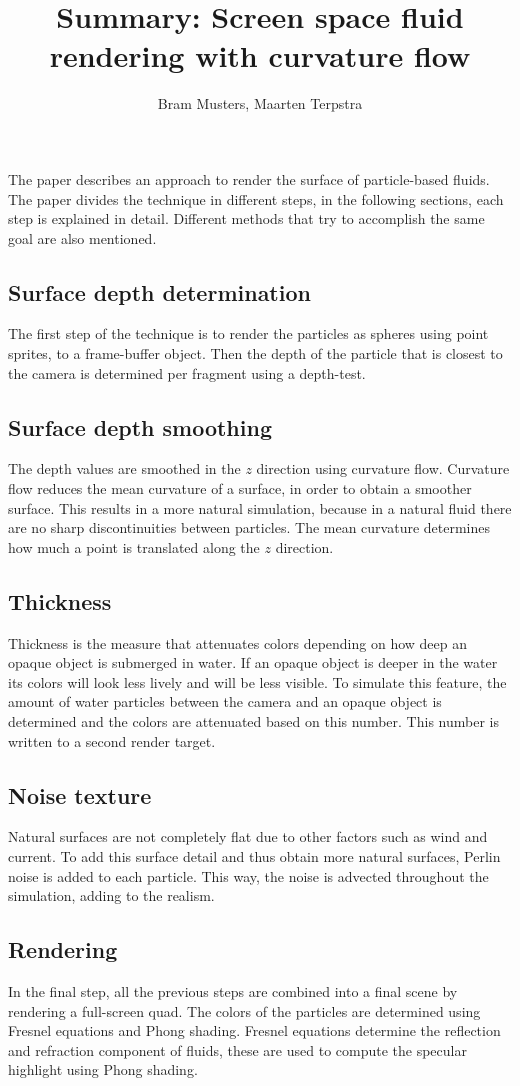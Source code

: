 \documentclass{article}
\title{Summary: Screen space fluid rendering with curvature flow}
\author{Bram Musters, Maarten Terpstra}
\begin{document}
\maketitle
The paper describes an approach to render the surface of particle-based fluids.
The paper divides the technique in different steps, in the following sections, each step is explained in detail.
Different methods that try to accomplish the same goal are also mentioned.


\subsection*{Surface depth determination}
The first step of the technique is to render the particles as spheres using point sprites, to a frame-buffer object.
Then the depth of the particle that is closest to the camera is determined per fragment using a depth-test.

\subsection*{Surface depth smoothing}
The depth values are smoothed in the $z$ direction using curvature flow.
Curvature flow reduces the mean curvature of a surface, in order to obtain a smoother surface.
This results in a more natural simulation, because in a natural fluid there are no sharp discontinuities between particles.
The mean curvature determines how much a point is translated along the $z$ direction.

\subsection*{Thickness}
Thickness is the measure that attenuates colors depending on how deep an opaque object is submerged in water.
If an opaque object is deeper in the water its colors will look less lively and will be less visible.
To simulate this feature, the amount of water particles between the camera and an opaque object is determined and the colors are attenuated based on this number.
This number is written to a second render target.

\subsection*{Noise texture}
Natural surfaces are not completely flat due to other factors such as wind and current.
To add this surface detail and thus obtain more natural surfaces, Perlin noise is added to each particle.
This way, the noise is advected throughout the simulation, adding to the realism.

\subsection*{Rendering}
In the final step, all the previous steps are combined into a final scene by rendering a full-screen quad.
The colors of the particles are determined using Fresnel equations and Phong shading.
Fresnel equations determine the reflection and refraction component of fluids, these are used to compute the specular highlight using Phong shading.
\end{document}
